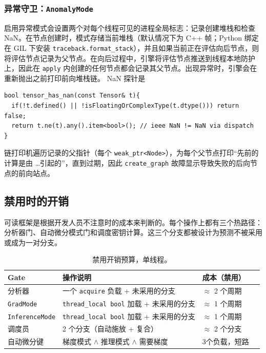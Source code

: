 \subsubsection{异常守卫：\texttt{AnomalyMode}}

启用异常模式会设置两个对每个线程可见的进程全局标志：记录创建堆栈和检查 NaN。在节点创建时，模式存储当前堆栈（默认情况下为 C++ 帧；Python 绑定在 GIL 下安装 \texttt{traceback.format\_stack}），并且如果当前正在评估向后节点，则将评估节点记录为父节点。在向后过程中，引擎将评估节点推送到线程本地防护上，因此在 \texttt{apply} 内创建的任何节点都会记录其父节点。出现异常时，引擎会在重新抛出之前打印前向堆栈链。 NaN 探针是

\begin{lstlisting}[caption={The NaN probe runs under a disabled grad-mode guard so it never records history.}, label=lst:nanprobe-eval]
bool tensor_has_nan(const Tensor& t){
  if(!t.defined() || !isFloatingOrComplexType(t.dtype())) return false;
  return t.ne(t).any().item<bool>(); // ieee NaN != NaN via dispatch
}
\end{lstlisting}

链打印机遍历记录的父指针（每个 \texttt{weak\_ptr<Node>}），为每个父节点打印“先前的计算是由 \dots 引起的”，直到过期，因此 \texttt{create\_graph} 故障显示导致失败的后向节点的前向站点。

\subsection{禁用时的开销}
\label{subsec:eval-overhead}

可读框架是根据开发人员不注意时的成本来判断的。每个操作上都有三个热路径：分析器门、自动微分模式门和调度密钥计算。这三个分支都被设计为预测不被采用或成为一对分支。

\begin{table}[H]
\centering
\caption{禁用开销预算，单线程。}
\label{tab:overhead}
\small
\begin{tabular}{llll}
\toprule
Gate & 操作说明 & 成本（禁用） \\
\midrule
分析器 & 一个 \texttt{acquire} 负载 + 未采用的分支 & $\approx$ 2 个周期 \\
\texttt{GradMode} & \texttt{thread\_local bool} 加载 + 未采用的分支 & $\approx$ 1 个周期 \\
\texttt{InferenceMode} & \texttt{thread\_local bool} 加载 + 未采用的分支 & $\approx$ 1 个周期 \\
调度员 & 2 个分支（自动施放 + 复合） & $\approx$ 2 个分支 \\
自动微分键 & 梯度模式 $\land$ 推理模式 $\land$ 需要梯度 & 3个负载，短路 \\
\bottomrule
\end{tabular}
\end{table}

